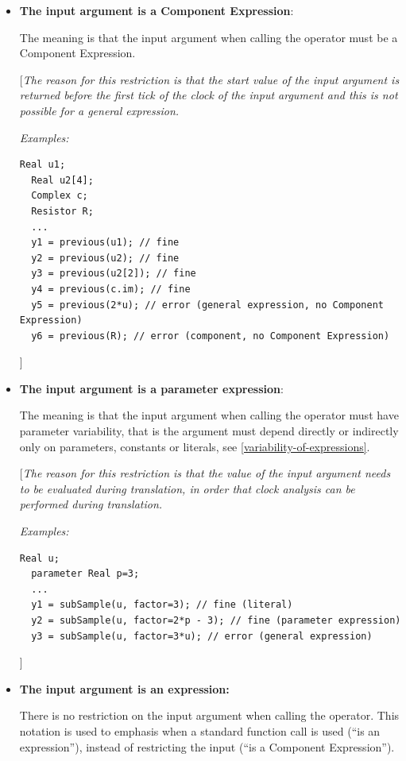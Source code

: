 \documentclass[10pt,a4paper]{report}
\begin{document}
\begin{itemize}
\item
  \textbf{The input argument is a Component Expression}:
  
  The meaning is that the input argument when calling the operator must
  be a Component Expression.
  
  {[}\emph{The reason for this restriction is that the start value of
  the input argument is returned before the first tick of the clock of
  the input argument and this is not possible for a general
  expression.}
  
  \emph{Examples:}
\begin{lstlisting}[language=modelica]
  Real u1;
  Real u2[4];
  Complex c;
  Resistor R;
  ...
  y1 = previous(u1); // fine
  y2 = previous(u2); // fine
  y3 = previous(u2[2]); // fine
  y4 = previous(c.im); // fine
  y5 = previous(2*u); // error (general expression, no Component Expression)
  y6 = previous(R); // error (component, no Component Expression)
\end{lstlisting}
{]}
\item
  \textbf{The input argument is a parameter expression}:
  
  The meaning is that the input argument when calling the operator must
  have parameter variability, that is the argument must depend directly
  or indirectly only on parameters, constants or literals, see 
  \ref{variability-of-expressions}.
  
  {[}\emph{The reason for this restriction is that the value of the
  input argument needs to be evaluated during translation, in order that
  clock analysis can be performed during translation.}

  \emph{Examples:}
\begin{lstlisting}[language=modelica]
  Real u;
  parameter Real p=3;
  ...
  y1 = subSample(u, factor=3); // fine (literal)
  y2 = subSample(u, factor=2*p - 3); // fine (parameter expression)
  y3 = subSample(u, factor=3*u); // error (general expression)
\end{lstlisting}
{]}
\item
  \textbf{The input argument is an expression:}
  
  There is no restriction on the input argument when calling the
  operator. This notation is used to emphasis when a standard function
  call is used (``is an expression''), instead of restricting the input
  (``is a Component Expression'').
\end{itemize}
\end{document}
